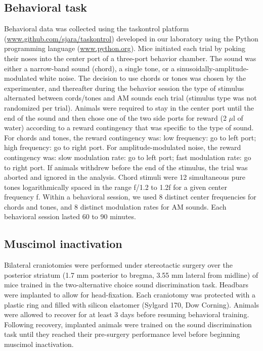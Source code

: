 \subsection{Behavioral task}
Behavioral data was collected using the taskontrol platform
(\url{www.github.com/sjara/taskontrol}) developed in our laboratory using the
Python programming language (\url{www.python.org}).
%
Mice initiated each trial by poking their noses into the center port of a
three-port behavior chamber.
%
%
The sound was either a narrow-band sound (chord), a single tone, or a
sinusoidally-amplitude-modulated white noise.
%
The decision to use chords or tones was chosen by the experimenter, and
thereafter during the behavior session the type of stimulus alternated between
cords/tones and AM sounds each trial (stimulus type was not randomized per
trial).
%
Animals were required to stay in the center port until the end of the sound and
then chose one of the two side ports for reward (2 $\mu$l of water) according
to a reward contingency that was specific to the type of sound.
%
For chords and tones, the reward contingency was: low frequency: go to left
port; high frequency: go to right port.
%
For amplitude-modulated noise, the reward contingency was: slow modulation
rate: go to left port; fast modulation rate: go to right port.
%
If animals withdrew before the end of the stimulus, the trial was aborted and
ignored in the analysis.
%
Chord stimuli were 12 simultaneous pure tones logarithmically spaced in the
range f/1.2 to 1.2f for a given center frequency f.
%
Within a behavioral session, we used 8 distinct center frequencies for chords
and tones, and 8 distinct modulation rates for AM sounds.
%
Each behavioral session lasted 60 to 90 minutes.

\subsection{Muscimol inactivation}
Bilateral craniotomies were performed under stereotactic surgery over the
posterior striatum (1.7 mm posterior to bregma, 3.55 mm lateral from midline)
of mice trained in the two-alternative choice sound discrimination task.
Headbars were implanted to allow for head-fixation. Each craniotomy was
protected with a plastic ring and filled with silicon elastomer (Sylgard 170,
Dow Corning). Animals were allowed to recover for at least 3 days before
resuming behavioral training. Following recovery, implanted animals were
trained on the sound discrimination task until they reached their pre-surgery
performance level before beginning muscimol inactivation.

